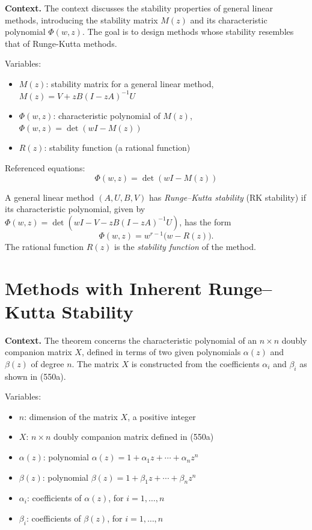 \noindent\textbf{Context.}
The context discusses the stability properties of general linear methods, introducing the stability matrix \(M(z)\) and its characteristic polynomial \(\Phi(w, z)\). The goal is to design methods whose stability resembles that of Runge-Kutta methods.

Variables:
\begin{itemize}
    \item \(M(z)\): stability matrix for a general linear method, \(M(z) = V + zB(I - zA)^{-1} U\)
    \item \(\Phi(w, z)\): characteristic polynomial of \(M(z)\), \(\Phi(w, z) = \det(wI - M(z))\)
    \item \(R(z)\): stability function (a rational function)
\end{itemize}

Referenced equations:
\begin{equation}
\Phi(w, z) = \det(wI - M(z)) \tag{542a}
\end{equation}

\begin{definition}

  \label{def:542A}
A general linear method $(A, U, B, V)$ has \emph{Runge--Kutta stability} (RK stability) if its characteristic polynomial, given by $\Phi(w,z)=\det(wI-V-zB(I-zA)^{-1}U)$, has the form
\[
\Phi(w,z) = w^{r-1}\bigl(w - R(z)\bigr).
\]
The rational function $R(z)$ is the \emph{stability function} of the method.
\end{definition}

\section{Methods with Inherent Runge–Kutta Stability}

\noindent\textbf{Context.}
The theorem concerns the characteristic polynomial of an $n\times n$ doubly companion matrix $X$, defined in terms of two given polynomials $\alpha(z)$ and $\beta(z)$ of degree $n$. The matrix $X$ is constructed from the coefficients $\alpha_i$ and $\beta_i$ as shown in (550a).

Variables:
\begin{itemize}
    \item $n$: dimension of the matrix $X$, a positive integer
    \item $X$: $n \times n$ doubly companion matrix defined in (550a)
    \item $\alpha(z)$: polynomial $\alpha(z) = 1 + \alpha_1 z + \cdots + \alpha_n z^n$
    \item $\beta(z)$: polynomial $\beta(z) = 1 + \beta_1 z + \cdots + \beta_n z^n$
    \item $\alpha_i$: coefficients of $\alpha(z)$, for $i = 1,\dots,n$
    \item $\beta_i$: coefficients of $\beta(z)$, for $i = 1,\dots,n$
\end{itemize}

